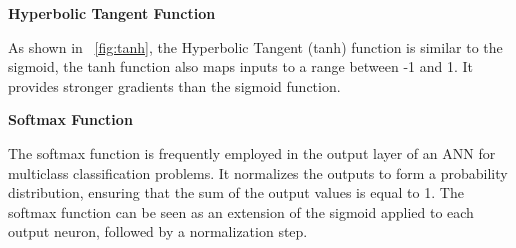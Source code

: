 \vspace{0.2cm}
\textbf{Hyperbolic Tangent Function}

As shown in \Fig~\ref{fig:tanh}, the Hyperbolic Tangent (tanh) function is similar to the sigmoid, the tanh function also maps inputs to a range between -1 and 1. It provides stronger gradients than the sigmoid function.

\vspace{0.2cm}
\textbf{Softmax Function}

The softmax function is frequently employed in the output layer of an ANN for multiclass classification problems. It normalizes the outputs to form a probability distribution, ensuring that the sum of the output values is equal to 1. The softmax function can be seen as an extension of the sigmoid applied to each output neuron, followed by a normalization step.

